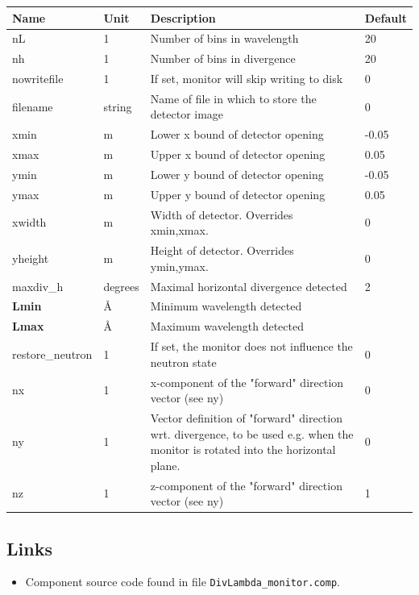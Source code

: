\begin{longtable}{p{}p{}p{}p{}}
\toprule
\textbf{Name} & \textbf{Unit} & \textbf{Description} & \textbf{Default} \\
\midrule
\endhead
nL & 1 & Number of bins in wavelength & 20 \\
nh & 1 & Number of bins in divergence & 20 \\
nowritefile & 1 & If set, monitor will skip writing to disk & 0 \\
filename & string & Name of file in which to store the detector image & 0 \\
xmin & m & Lower x bound of detector opening & -0.05 \\
xmax & m & Upper x bound of detector opening & 0.05 \\
ymin & m & Lower y bound of detector opening & -0.05 \\
ymax & m & Upper y bound of detector opening & 0.05 \\
xwidth & m & Width of detector. Overrides xmin,xmax. & 0 \\
yheight & m & Height of detector. Overrides ymin,ymax. & 0 \\
maxdiv\_h & degrees & Maximal horizontal divergence detected & 2 \\
\textbf{Lmin} & \AA{} & Minimum wavelength detected &  \\
\textbf{Lmax} & \AA{} & Maximum wavelength detected &  \\
restore\_neutron & 1 & If set, the monitor does not influence the neutron state & 0 \\
nx & 1 & x-component of the "forward" direction vector (see ny) & 0 \\
ny & 1 & Vector definition of "forward" direction wrt. divergence, to be used e.g. when the monitor is rotated into the horizontal plane. & 0 \\
nz & 1 & z-component of the "forward" direction vector (see ny) & 1 \\
\bottomrule
\end{longtable}

\subsection*{Links}
\begin{itemize}
  \item Component source code found in file \texttt{DivLambda\_monitor.comp}.
\end{itemize}
